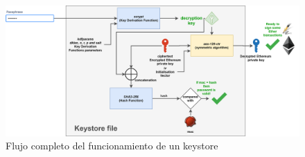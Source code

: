 \begin{figure}[h!]
  \centering
  \includegraphics[width=0.8\linewidth]{figs/Anexo/keystore_completo}
  \caption[Flujo completo del funcionamiento de un keystore]{Flujo completo del funcionamiento de un keystore}
  \label{fig:keystore_completo}
\end{figure}
